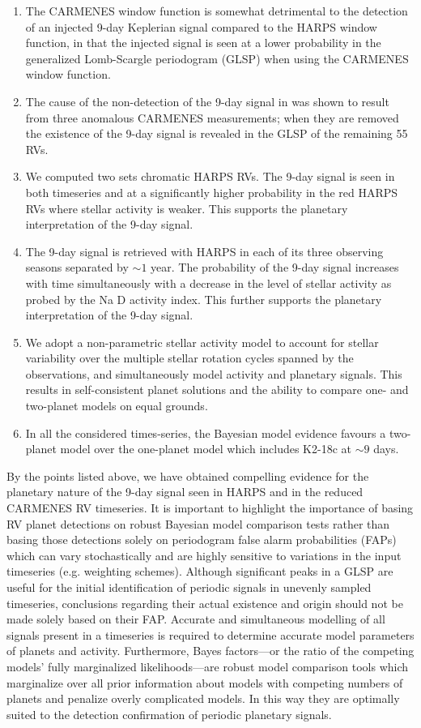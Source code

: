 \begin{enumerate}
\item The CARMENES window function is somewhat detrimental to the detection of an injected 9-day Keplerian
  signal compared to the HARPS window function, in that the injected signal is seen at a lower probability in
  the generalized Lomb-Scargle periodogram (GLSP) when using the CARMENES window function.
\item The cause of the non-detection of the 9-day signal in  was shown to result from
  three anomalous CARMENES measurements; when they are removed  the existence of the 9-day signal is revealed in the GLSP
  of the remaining 55 RVs.
\item We computed two sets chromatic HARPS RVs. The 9-day
  signal is seen in both timeseries and at a significantly higher probability in the red HARPS RVs where stellar
  activity is weaker. This supports the planetary interpretation of the 9-day signal.
\item The 9-day signal is retrieved with HARPS in each of its three observing seasons separated by $\sim 1$ year.
  The probability of the 9-day signal increases with time simultaneously with a decrease in the level of stellar
  activity as probed by the Na D activity index. This further supports the planetary interpretation of the 9-day
  signal.
\item We adopt a non-parametric stellar activity model to account for stellar variability over the multiple stellar
  rotation cycles spanned by the observations, and simultaneously model activity and planetary signals. This results in
  self-consistent planet solutions and the ability to compare one- and two-planet models on equal grounds.
\item In all the considered times-series, the Bayesian model evidence favours a two-planet model over the one-planet model which
  includes K2-18c at $\sim 9$ days.
\end{enumerate}

By the points listed above, we have obtained compelling evidence for the planetary nature of the 9-day signal seen in HARPS and
in the reduced CARMENES RV timeseries. It is important to highlight the importance of basing RV planet
detections on robust Bayesian model comparison tests rather than basing those detections
solely on  periodogram false alarm probabilities (FAPs) which can vary stochastically and are highly sensitive to variations
in the input timeseries (e.g. weighting schemes). Although significant peaks in a GLSP are useful for the initial
identification of periodic signals in unevenly sampled timeseries, conclusions regarding their actual existence and origin
should not be made solely based on their FAP. Accurate and simultaneous modelling of all signals present in a
timeseries is required to determine accurate model parameters of planets and activity. Furthermore,
Bayes factors---or the ratio of the competing models' fully
marginalized likelihoods---are robust model comparison tools which marginalize over all prior information about
models with competing numbers of planets and penalize overly complicated models. In this way they are optimally
suited to the detection confirmation of periodic planetary signals.

